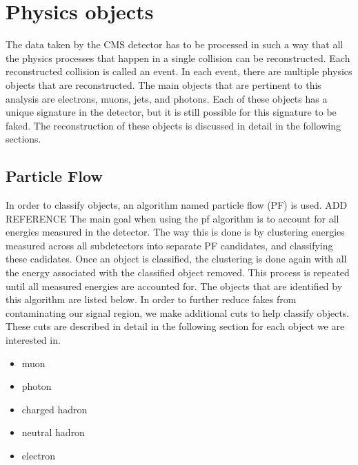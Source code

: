 \section{Physics objects}
The data taken by the CMS detector has to be processed in such a way that all the physics processes that happen in a single collision can be reconstructed.
Each reconstructed collision is called an event.
In each event, there are multiple physics objects that are reconstructed.
The main objects that are pertinent to this analysis are electrons, muons, jets, and photons.
Each of these objects has a unique signature in the detector, but it is still possible for this signature to be faked.
The reconstruction of these objects is discussed in detail in the following sections.

\subsection{Particle Flow}
\label{subs:particleflow}
In order to classify objects, an algorithm named particle flow (PF) is used. ADD REFERENCE
The main goal when using the pf algorithm is to account for all energies measured in the detector.
The way this is done is by clustering energies measured across all subdetectors into separate PF candidates, and classifying these cadidates.
Once an object is classified, the clustering is done again with all the energy associated with the classified object removed.
This process is repeated until all measured energies are accounted for.
The objects that are identified by this algorithm are listed below.
In order to further reduce fakes from contaminating our signal region, we make additional cuts to help classify objects.
These cuts are described in detail in the following section for each object we are interested in.

\begin{itemize}
\item muon          
\item photon        
\item charged hadron
\item neutral hadron
\item electron      
\end{itemize}

